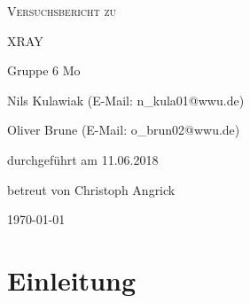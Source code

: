 \documentclass[
	a4paper,
	12pt,
	pagesize,
	ngerman
]{scrartcl}
\begin{document}
\begin{titlepage}
	\centering
	{\scshape\LARGE Versuchsbericht zu \par}
	\vspace{1cm}
	{\scshape\huge XRAY \par}
	\vspace{2.5cm}
	{\LARGE Gruppe 6 Mo\par}
	\vspace{0.5cm}
	{\large Nils Kulawiak (E-Mail: n\_kula01@wwu.de) \par}
	{\large Oliver Brune (E-Mail: o\_brun02@wwu.de) \par}
	\vfill
	durchgeführt am 11.06.2018\par
	
	\vfill
	betreut von Christoph Angrick
	{\large \today\par}
\end{titlepage}

\tableofcontents
		
\newpage

\section{Einleitung}
\end{document}
